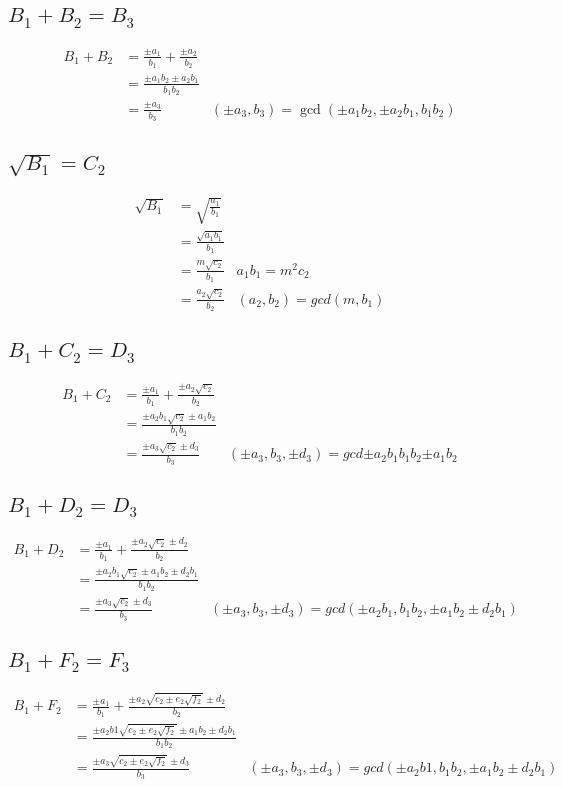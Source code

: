 \documentclass{article}
\begin{document}
\subsection{$B_1 + B_2 = B_3$}
\begin{align*}
B_1 + B_2 &= \frac{\pm a_1}{b_1} + \frac{\pm a_2}{b_2} \\
 &= \frac{\pm a_1b_2 \pm a_2b_1 }{b_1b_2} \\
 &= \frac{\pm a_3}{b_3} & (\pm a_3,b_3) = \gcd(\pm a_1b_2, \pm a_2b_1,b_1b_2)
\end{align*}

\subsection{$\sqrt{B_1} = C_2$}
\begin{align*}
\sqrt{B_1} &= \sqrt{\frac{a_1}{b_1}}\\
  &= \frac{\sqrt{a_1b_1}}{b_1}\\
  &= \frac{m\sqrt{c_2}}{b_1}    & a_1b_1 = m^2c_2\\
  &= \frac{a_2\sqrt{c_2}}{b_2}  & (a_2, b_2) = gcd(m, b_1)
\end{align*}

\subsection{$B_1 + C_2 = D_3$}
\begin{align*}
B_1 + C_2 &= \frac{\pm a_1}{b_1} + \frac{\pm a_2\sqrt{c_2}}{b_2}\\
 &= \frac{\pm a_2b_1\sqrt{c_2} \pm a_1b_2 }{b_1b_2}\\
 &= \frac{\pm a_3\sqrt{c_2} \pm d_3 }{b_3} & (\pm a_3, b_3, \pm d_3) = gcd{\pm a_2b_1}{b_1b_2}{\pm a_1b_2}
\end{align*}

\subsection{$B_1 + D_2 = D_3$}
\begin{align*}
B_1 + D_2 &= \frac{\pm a_1}{b_1} + \frac{\pm a_2\sqrt{c_2} \pm d_2}{b_2}\\
 &= \frac{\pm a_2b_1\sqrt{c_2} \pm a_1b_2 \pm d_2b_1 }{b_1b_2}\\
 &= \frac{\pm a_3\sqrt{c_2} \pm d_3 }{b_3} & (\pm a_3, b_3, \pm d_3) = gcd(\pm a_2b_1,b_1b_2,\pm a_1b_2 \pm d_2b_1)
\end{align*}

\subsection{$B_1 + F_2 = F_3$} %
\begin{align*}
B_1 + F_2 &= \frac{\pm a_1}{b_1} + \frac{\pm a_2\sqrt{c_2 \pm e_2\sqrt{f_2}} \pm d_2}{b_2}\\
 &= \frac{\pm a_2b1\sqrt{c_2 \pm e_2\sqrt{f_2}} \pm a_1b_2 \pm d_2b_1}{b_1b_2}\\
 &= \frac{\pm a_3\sqrt{c_2 \pm e_2\sqrt{f_2}} \pm d_3}{b_3} & (\pm a_3, b_3, \pm d_3)=gcd(\pm a_2b1,b_1b_2,\pm a_1b_2 \pm d_2b_1)
\end{align*}
\end{document}
